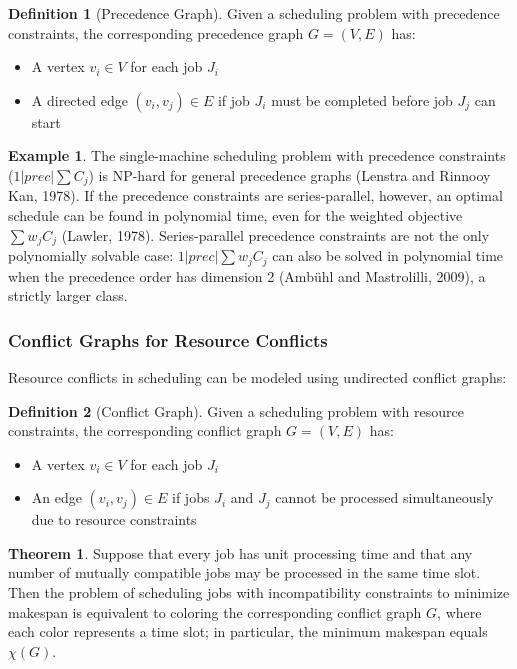 \documentclass{article}
\theoremstyle{definition}
\newtheorem{example}{Example}
\newtheorem{theorem}{Theorem}
\newtheorem{definition}{Definition}
\begin{document}
\begin{definition}[Precedence Graph]
Given a scheduling problem with precedence constraints, the corresponding precedence graph $G = (V, E)$ has:
\begin{itemize}
    \item A vertex $v_i \in V$ for each job $J_i$
    \item A directed edge $(v_i, v_j) \in E$ if job $J_i$ must be completed before job $J_j$ can start
\end{itemize}
\end{definition}

\begin{example}
The single-machine scheduling problem with precedence constraints ($1|prec|\sum C_j$) is NP-hard for general precedence graphs (Lenstra and Rinnooy Kan, 1978). If the precedence constraints are series-parallel, however, an optimal schedule can be found in polynomial time, even for the weighted objective $\sum w_j C_j$ (Lawler, 1978). Series-parallel precedence constraints are not the only polynomially solvable case: $1|prec|\sum w_j C_j$ can also be solved in polynomial time when the precedence order has dimension 2 (Amb\"uhl and Mastrolilli, 2009), a strictly larger class.
\end{example}

\subsubsection*{Conflict Graphs for Resource Conflicts}

Resource conflicts in scheduling can be modeled using undirected conflict graphs:

\begin{definition}[Conflict Graph]
Given a scheduling problem with resource constraints, the corresponding conflict graph $G = (V, E)$ has:
\begin{itemize}
    \item A vertex $v_i \in V$ for each job $J_i$
    \item An edge $(v_i, v_j) \in E$ if jobs $J_i$ and $J_j$ cannot be processed simultaneously due to resource constraints
\end{itemize}
\end{definition}

\begin{theorem}
Suppose that every job has unit processing time and that any number of mutually compatible jobs may be processed in the same time slot. Then the problem of scheduling jobs with incompatibility constraints to minimize makespan is equivalent to coloring the corresponding conflict graph $G$, where each color represents a time slot; in particular, the minimum makespan equals $\chi(G)$.
\end{theorem}
\end{document}
